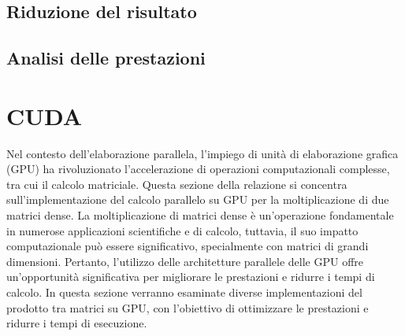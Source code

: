 \documentclass[conference]{IEEEtran}
\begin{document}
\subsection{Riduzione del risultato}
\subsection{Analisi delle prestazioni}
\section{CUDA}
Nel contesto dell'elaborazione parallela, l'impiego di unità di elaborazione grafica (GPU) ha rivoluzionato l'accelerazione di operazioni computazionali complesse, tra cui il calcolo matriciale. Questa sezione della relazione si concentra sull'implementazione del calcolo parallelo su GPU per la moltiplicazione di due matrici dense. La moltiplicazione di matrici dense è un'operazione fondamentale in numerose applicazioni scientifiche e di calcolo, tuttavia, il suo impatto computazionale può essere significativo, specialmente con matrici di grandi dimensioni. Pertanto, l'utilizzo delle architetture parallele delle GPU offre un'opportunità significativa per migliorare le prestazioni e ridurre i tempi di calcolo. In questa sezione verranno esaminate diverse implementazioni del prodotto tra matrici su GPU, con l'obiettivo di ottimizzare le prestazioni e ridurre i tempi di esecuzione.
\end{document}
